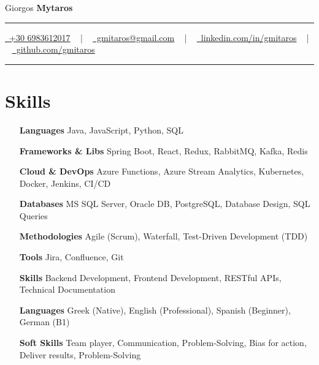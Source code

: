 \documentclass[letterpaper,10pt]{article}
\newcommand{\documentTitle}[2]{
  \begin{center}
    {\Huge\color{accentTitle} #1}
    \vspace{10pt}
    {\color{accentLine} \hrule}
    \vspace{2pt}
    \footnotesize{#2}
    \vspace{2pt}
    {\color{accentLine} \hrule}
  \end{center}
}
\newcommand{\tinysection}[1]{
  \phantomsection
  \addcontentsline{toc}{section}{#1}
  {\large{\bfseries\color{accentText}#1} {\color{accentLine} |}}
}
\begin{document}

  \documentTitle{Giorgos \textbf{Mytaros}}{
    \href{tel:+306983612017}{
      \raisebox{-0.05\height} \faPhone\ +30 6983612017} ~ | ~
    \href{mailto:gmitaros@gmail.com}{
      \raisebox{-0.15\height} \faEnvelope\ gmitaros@gmail.com} ~ | ~
    \href{https://www.linkedin.com/in/gmitaros/}{
      \raisebox{-0.15\height} \faLinkedin\ linkedin.com/in/gmitaros} ~ | ~
    \href{https://github.com/gmitaros}{
      \raisebox{-0.15\height} \faGithub\ github.com/gmitaros}
  }




  \section{Skills}

    \begin{itemize}[itemsep=-1.5px, parsep=0.5pt, leftmargin=90pt]
     \item[\textbf{Languages}] Java, JavaScript, Python, SQL
      \item[\textbf{Frameworks \& Libs}] Spring Boot, React, Redux, RabbitMQ, Kafka, Redis
      \item[\textbf{Cloud \& DevOps}] Azure Functions, Azure Stream Analytics, Kubernetes, Docker, Jenkins, CI/CD
      \item[\textbf{Databases}] MS SQL Server, Oracle DB, PostgreSQL, Database Design, SQL Queries
      \item[\textbf{Methodologies}] Agile (Scrum), Waterfall, Test-Driven Development (TDD)
      \item[\textbf{Tools}] Jira, Confluence, Git
      \item[\textbf{Skills}] Backend Development, Frontend Development, RESTful APIs, Technical Documentation
      \item[\textbf{Languages}] Greek (Native), English (Professional), Spanish (Beginner), German (B1)
      \item[\textbf{Soft Skills}] Team player, Communication, Problem-Solving, Bias for action, Deliver results, Problem-Solving
    \end{itemize}
\end{document}
